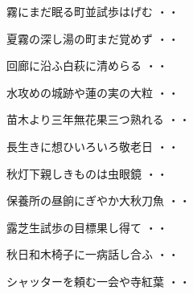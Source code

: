 \begin{shiika}霧にまだ眠る町並試歩はげむ
\hfill{・・}\end{shiika}
\vspace{0.6cm}
\begin{shiika}夏霧の深し湯の町まだ覚めず
\hfill{・・}\end{shiika}
\vspace{0.6cm}
\begin{shiika}回廊に沿ふ白萩に清めらる
\hfill{・・}\end{shiika}
\vspace{0.6cm}
\begin{shiika}水攻めの城跡や蓮の実の大粒
\hfill{・・}\end{shiika}
\vspace{0.6cm}
\begin{shiika}苗木より三年無花果三つ熟れる
\hfill{・・}\end{shiika}
\vspace{0.6cm}
\begin{shiika}長生きに想ひいろいろ敬老日
\hfill{・・}\end{shiika}
\vspace{0.6cm}
\begin{shiika}秋灯下親しきものは虫眼鏡
\hfill{・・}\end{shiika}
\vspace{0.6cm}
\begin{shiika}保養所の昼餉にぎやか大秋刀魚
\hfill{・・}\end{shiika}
\vspace{0.6cm}
\begin{shiika}露芝生試歩の目標果し得て
\hfill{・・}\end{shiika}
\vspace{0.6cm}
\begin{shiika}秋日和木椅子に一病話し合ふ
\hfill{・・}\end{shiika}
\vspace{0.6cm}
\begin{shiika}シャッターを頼む一会や寺紅葉
\hfill{・・}\end{shiika}
\vspace{0.6cm}
